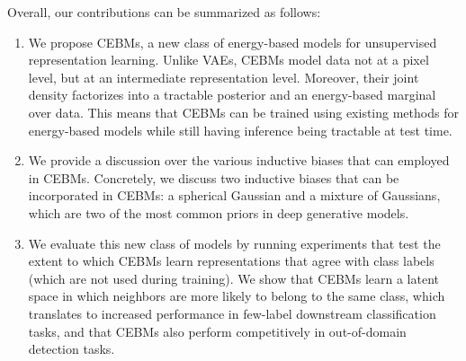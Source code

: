 \documentclass{article}
\begin{document}



Overall, our contributions can be summarized as follows:
\begin{enumerate}[noitemsep,topsep=0pt,parsep=6pt,partopsep=0pt]
    \item We propose CEBMs, a new class of energy-based models for unsupervised representation learning. Unlike VAEs, CEBMs model data not at a pixel level, but at an intermediate representation level. Moreover, their joint density factorizes into a tractable posterior and an energy-based marginal over data. This means that CEBMs can be trained using existing methods for energy-based models while still having inference being tractable at test time. 
    \item We provide a discussion over the various inductive biases that can employed in CEBMs. Concretely, we discuss two inductive biases that can be incorporated in CEBMs: a spherical Gaussian and a mixture of Gaussians, which are two of the most common priors in deep generative models. 
    \item We evaluate this new class of models by running experiments that test the extent to which CEBMs learn representations that agree with class labels (which are not used during training). We show that CEBMs learn a latent space in which neighbors are more likely to belong to the same class, which translates to increased performance in few-label downstream classification tasks, and that CEBMs also perform competitively in out-of-domain detection tasks.
\end{enumerate}





\end{document}
